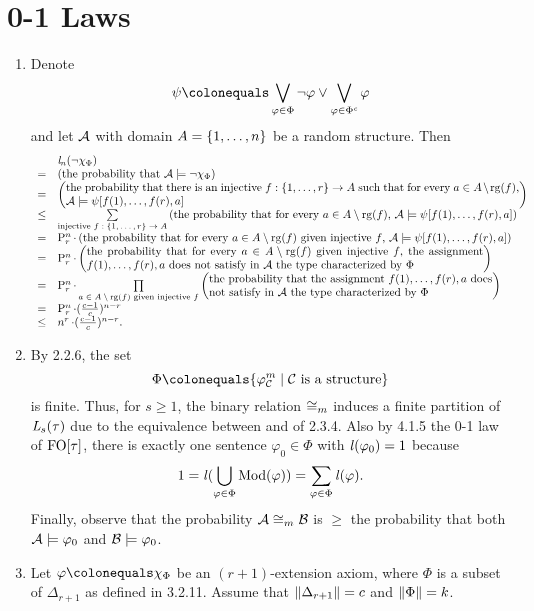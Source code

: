 \setcounter{chapter}{3}
\chapter{0-1 Laws}
\begin{enumerate}[1.]
%
\item {} Denote
\[
\psi \defas \blor_{\varphi \in \Phi} \neg\varphi \lor \blor_{\varphi \in \cmpl{\Phi}} \varphi
\]
and let $\mathcal{A}$ with domain $A = {\{1, \ldots, n\}}$ be a random structure. Then
\[
\begin{array}{ll}
\    & \lprob[n](\neg\extaxm[\Phi]) \cr
=    & \paren{\mbox{the probability that \mathmode{\strct{A} \satis \neg\extaxm[\Phi]}}} \cr
=    & \paren{\parbox{40em}{the probability that there is an injective \mathmode{f : \sete{1, \etc, r} \to A} such that for every \mathmode{a \in A \setminus \rg(f)}, \mathmode{\strct{A} \satis \psi[f(1), \etc, f(r), a]}}} \cr
\leq & \sum\limits_{\text{injective \mathmode{f : \sete{1, \etc, r} \to A}}} \paren{\mbox{the probability that for every \mathmode{a \in A \setminus \rg(f)}, \mathmode{\strct{A} \satis \psi[f(1), \etc, f(r), a]}}} \cr
=    & \prmt{n}{r} \mul \paren{\mbox{the probability that for every \mathmode{a \in A \setminus \rg(f)} given injective \mathmode{f}, \mathmode{\strct{A} \satis \psi[f(1), \etc, f(r), a]}}} \cr
=    & \prmt{n}{r} \mul \paren{\parbox{35em}{the probability that for every \mathmode{a \in A \setminus \rg(f)} given injective \mathmode{f}, the assignment \mathmode{f(1), \etc, f(r), a} does not satisfy in \mathmode{\strct{A}} the type characterized by \mathmode{\Phi}}} \cr
=    & \prmt{n}{r} \mul \prod\limits_{\text{\mathmode{a \in A \setminus \rg(f)} given injective \mathmode{f}}} \paren{\parbox{25em}{the probability that the assignment \mathmode{f(1), \etc, f(r), a} does not satisfy in \mathmode{\strct{A}} the type characterized by \mathmode{\Phi}}} \cr
=    & \prmt{n}{r} \mul (\frac{c - 1}{c})^{n - r} \cr
\leq & n^r \mul (\frac{c - 1}{c})^{n - r}. \cr
\end{array}
\]
%
\item {} By 2.2.6, the set
\[
\Phi \defas \sett{\hint{m}{\strct{C}}}{\mathmode{\strct{C}} is a structure}
\]
is finite. Thus, for $s \geq 1$, the binary relation $\isom_m$ induces a finite partition of $\mathit{L}_{s}(\tau)$ due to the equivalence between  and  of 2.3.4. Also by 4.1.5 the 0-1 law of $\folog\of{\tau}$, there is exactly one sentence $\varphi_0 \in \Phi$ with $\lprob(\varphi_0) = 1$ because
\[
1 = \lprob(\bunion_{\varphi \in \Phi} \modclass(\varphi)) = \sum_{\varphi \in \Phi} \lprob(\varphi).
\]
Finally, observe that the probability $\strct{A} \isom_m \strct{B}$ is $\geq$ the probability that both $\mathcal{A} \models \varphi_0$ and $\mathcal{B} \models \varphi_0$.
%
\item {} Let $\varphi \defas \extaxm[\Phi]$ be an $(r + 1)$-extension axiom, where $\Phi$ is a subset of $\Delta_{r + 1}$ as defined in 3.2.11. Assume that $\|\Delta_{r + 1}\| = c$ and $\|\Phi\| = k$.


\end{enumerate}
